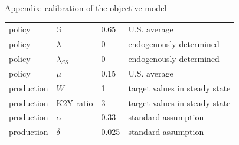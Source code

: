 \documentclass{beamer}
\begin{document}
\begin{frame}{Appendix: calibration of the objective model}
\begin{table}[p]
\begin{adjustbox}{width={0.8\textwidth}}
\begin{tabular}{llll}
		policy            & $\mathbb{S}$                & 0.65   & U.S. average                         \\
		policy            & $\lambda$                   & 0      & endogenously determined              \\
		policy            & $\lambda_{SS}$              & 0      & endogenously determined              \\
		policy            & $\mu$                       & 0.15   & U.S. average                         \\
		\hline 
		production        & $W$                         & 1      & target values in steady state        \\
		production        & K2Y ratio                   & 3      & target values in steady state        \\
		production        & $\alpha$                    & 0.33   & standard assumption                  \\
		production        & $\delta$                    & 0.025  & standard assumption          \\
		\hline 
	\end{tabular} 
		\end{adjustbox}
	\end{table}
	\hyperlink{objectivemodelresults}{} 
\end{frame}
\end{document}
